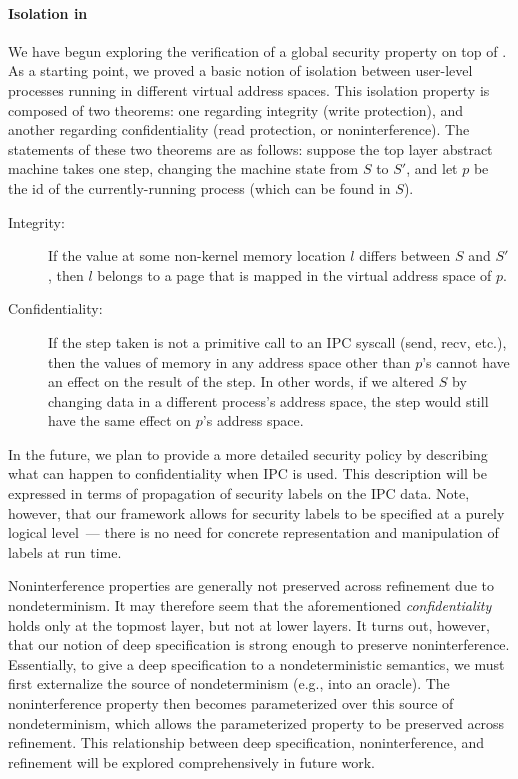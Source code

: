 {\paragraph{Isolation in \cCTOSbase{}}
\label{security}
We have begun exploring the verification of a global security property
on top of \cCTOSbase{}. As a starting point, we proved a basic notion
of isolation between user-level processes running in different virtual
address spaces. This isolation property is composed of two theorems:
one regarding integrity (write protection), and another regarding
confidentiality (read protection, or noninterference).  The statements
of these two theorems are as follows: suppose the top layer abstract
machine takes one step, changing the machine state from $S$ to $S'$,
and let $p$ be the id of the currently-running process (which can be
found in $S$).
\begin{description}
  \item[Integrity:]
If the value at some non-kernel memory location $l$ differs between
$S$ and $S'$, then $l$ belongs to a page that is mapped in the 
virtual address space of $p$.
\item[Confidentiality:]
\label{confidential}
If the step taken
is not a primitive call to an IPC syscall (send, recv, etc.), then the values
of memory in any address space other than $p$'s cannot have an effect on the
result of the step. In other words, if we altered $S$ 
by changing data in a different process's address space, the step would still 
have the same effect on $p$'s address space.
\end{description}

In the future, we plan to provide a more detailed security policy by
describing what can happen to confidentiality when IPC is used.  This
description will be expressed in terms of propagation of security
labels on the IPC data. Note, however, that our framework allows for
security labels to be specified at a purely logical level~--- there is
no need for concrete representation and manipulation of labels at run
time.

Noninterference properties are generally not preserved across
refinement due to nondeterminism. It may therefore seem that the
aforementioned \emph{confidentiality} holds only at the topmost layer,
but not at lower layers. It turns out, however, that our notion of
deep specification is strong enough to preserve
noninterference. Essentially, to give a deep specification to a
nondeterministic semantics, we must first externalize the source of
nondeterminism (e.g., into an oracle). The noninterference property
then becomes parameterized over this source of nondeterminism, which
allows the parameterized property to be preserved across
refinement. This relationship between deep specification,
noninterference, and refinement will be explored comprehensively in
future work.
}

